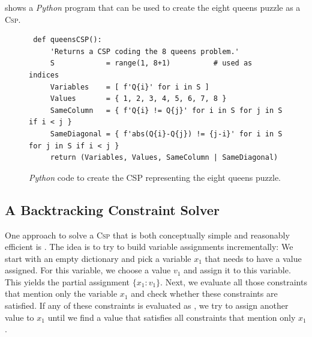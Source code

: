 shows a \textsl{Python} program that can be used to create the eight queens puzzle as a
\textsc{Csp}.  

\begin{figure}[!ht]
\centering
\begin{verbatim}
 def queensCSP():
     'Returns a CSP coding the 8 queens problem.'
     S            = range(1, 8+1)          # used as indices
     Variables    = [ f'Q{i}' for i in S ]
     Values       = { 1, 2, 3, 4, 5, 6, 7, 8 }
     SameColumn   = { f'Q{i} != Q{j}' for i in S for j in S if i < j }
     SameDiagonal = { f'abs(Q{i}-Q{j}) != {j-i}' for i in S for j in S if i < j }
     return (Variables, Values, SameColumn | SameDiagonal)
\end{verbatim}
\vspace*{-0.3cm}
\caption{\textsl{Python} code to create the CSP representing the eight queens puzzle.}
\label{fig:queens-csp.stlx}
\end{figure}


\subsection{A Backtracking Constraint Solver}
One approach to solve a \textsc{Csp} that is both conceptually simple and reasonably efficient is
.  The idea is to try to build variable assignments incrementally:  We start with
an empty dictionary and pick a variable $x_1$ that needs to have a value assigned.  For this variable, we
choose a value $v_1$ and assign it to this variable.  This yields the partial assignment $\{ x_1:v_1 \}$.
Next, we evaluate all those constraints that mention only the variable $x_1$ and check whether these constraints
are satisfied.  If any of these constraints is evaluated as , we try to assign another value to
$x_1$ until we find a value that satisfies all constraints that mention only $x_1$.

